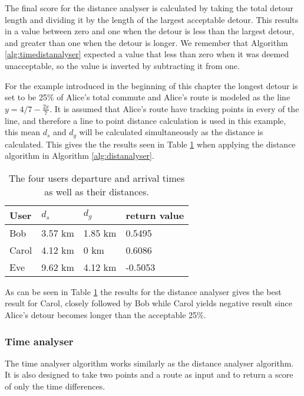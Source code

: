 The final score for the distance analyser is calculated by taking the total detour length and dividing it by the length of the largest acceptable detour.
This results in a value between zero and one when the detour is less than the largest detour, and greater than one when the detour is longer.
We remember that Algorithm \ref{alg:timedistanalyser} expected a value that less than zero when it was deemed unacceptable, so the value is inverted by subtracting it from one.

For the example introduced in the beginning of this chapter the longest detour is set to be 25\% of Alice's total commute and Alice's route is modeled  as the line  $y = 4/7-\frac{2 x}{7}$.
It is assumed that Alice's route have tracking points in every of the line, and therefore a line to point distance calculation is used in this example, this mean $d_s$ and $d_g$ will be calculated simultaneously as the distance is calculated.
This gives the the results seen in Table \ref{tbl:distance} when applying the distance algorithm in Algorithm \ref{alg:distanalyser}.

\begin{table}[!ht]
\centering
\begin{tabular}{@{}llll@{}}
\toprule
\textbf{User} 	& \textbf{$d_s$} & \textbf{$d_g$} 	& \textbf{return value} 	\\ \midrule
Bob         	& 3.57 km        & 1.85 km	    	& 0.5495 			\\
Carol         	& 4.12 km        & 0 km       		& 0.6086        		\\
Eve           	& 9.62 km        & 4.12 km		    & -0.5053        		\\ \bottomrule
\end{tabular}
\caption{The four users departure and arrival times as well as their distances.}
\label{tbl:distance}
\end{table}

As can be seen in Table \ref{tbl:distance} the results for the distance analyser gives the best result for Carol, closely followed by Bob while Carol yields negative result since Alice's detour becomes longer than the acceptable 25\%. 



\subsubsection{Time analyser}
The time analyser algorithm works similarly as the distance analyser algorithm. 
It is also designed to take two points and a route as input and to return a score of only the time differences.

